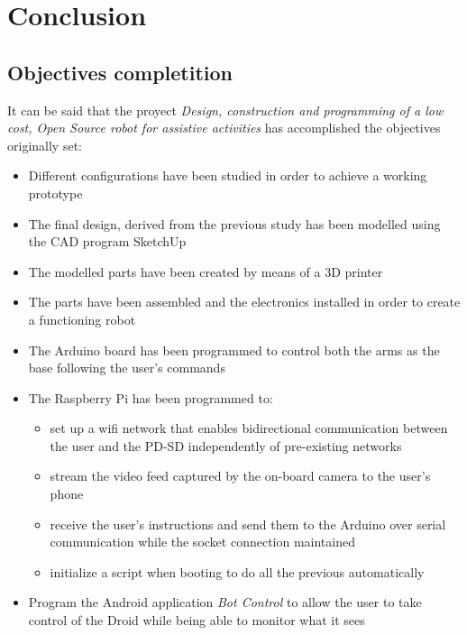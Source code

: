 \section{Conclusion}
\subsection{Objectives completition}
It can be said that the proyect \textit{Design, construction and programming of a low cost, Open Source robot for assistive activities} has accomplished the objectives originally set:

	\begin{itemize}

	\item Different configurations have been studied in order to achieve a working prototype

	\item The final design, derived from the previous study has been modelled using the CAD program SketchUp

	\item The modelled parts have been created by means of a 3D printer

	\item The parts have been assembled and the electronics installed in order to create a functioning robot

	\item The Arduino board has been programmed to control both the arms as the base following the user's commands

	\item The Raspberry Pi has been programmed to:

		\begin{itemize}
		
		\item set up a wifi network that enables bidirectional communication between the user and the PD-SD independently of pre-existing networks

		\item stream the video feed captured by the on-board camera to the user's phone

		\item receive the user's instructions and send them to the Arduino over serial communication while the socket connection maintained

		\item initialize a script when booting to do all the previous automatically

		\end{itemize}

	\item Program the Android application \textit{Bot Control} to allow the user to take control of the Droid while being able to monitor what it sees


	\end{itemize}



